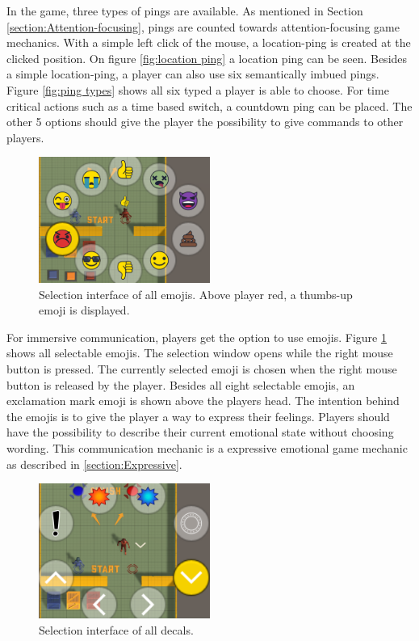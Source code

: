 In the game, three types of pings are available. As mentioned in
Section \ref{section:Attention-focusing}, pings are counted towards attention-focusing game mechanics. With a simple left click of the mouse, a location-ping is created at the clicked position. On figure \ref{fig:location ping} a location ping can be seen.
Besides a simple location-ping, a player can also use six semantically imbued pings. Figure \ref{fig:ping types} shows all six typed a player is able to choose. For time critical actions such as a time based switch, a countdown ping can be placed. The other 5 options should give the player the possibility to give commands to other players. 


\begin{figure}
    \centering
    \includegraphics[width=0.5\textwidth]{images/emoji_selection.png}
    \caption{Selection interface of all emojis. Above player red, a thumbs-up emoji is displayed.}
    \label{fig:emoji selection}
\end{figure}

For immersive communication, players get the option to use emojis.
Figure \ref{fig:emoji selection} shows all selectable emojis. The selection window opens while the right mouse button is pressed. The currently selected emoji is chosen when the right mouse button is released by the player.
Besides all eight selectable emojis, an exclamation mark emoji is shown above the players head. The intention behind the emojis is to give the player a way to express their feelings. Players should have the possibility to describe their current emotional state without choosing wording. This communication mechanic is a expressive emotional game mechanic as described in \ref{section:Expressive}.


\begin{figure}
    \centering
    \includegraphics[width=0.5\textwidth]{images/decal_selection.png}
    \caption{Selection interface of all decals.}
    \label{fig:decal selection}
\end{figure}

